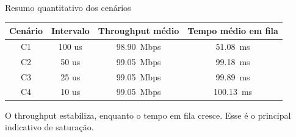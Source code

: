 \documentclass[aspectratio=169]{beamer}
\begin{document}
\begin{frame}{Resumo quantitativo dos cenários}
\begin{table}
\centering
\small
\begin{tabular}{cccc}
\toprule
\textbf{Cenário} & \textbf{Intervalo} & \textbf{Throughput médio} & \textbf{Tempo médio em fila} \\
\midrule
C1 & 100 us & \SI{98,90}{Mbps} & \SI{51,08}{ms} \\
C2 & 50 us  & \SI{99,05}{Mbps} & \SI{99,18}{ms} \\
C3 & 25 us  & \SI{99,05}{Mbps} & \SI{99,89}{ms} \\
C4 & 10 us  & \SI{99,05}{Mbps} & \SI{100,13}{ms} \\
\bottomrule
\end{tabular}
\end{table}

\vspace{0.4cm}

\begin{informacao}
O throughput estabiliza, enquanto o tempo em fila cresce. Esse é o principal indicativo de saturação.
\end{informacao}
\end{frame}
\end{document}
